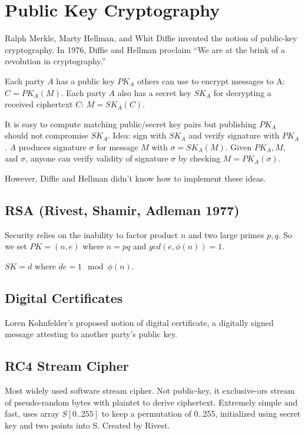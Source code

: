 \documentclass[psamsfonts]{amsart}
\begin{document}
\section{Public Key Cryptography}

Ralph Merkle, Marty Hellman, and Whit Diffie invented the notion of public-key cryptography. In 1976, Diffie and Hellman proclaim ``We are at the brink of a revolution in cryptography.''

Each party $A$ has a public key $PK_A$ others can use to encrypt messages to A: $C = PK_A(M)$. Each party $A$ also has a secret key $SK_A$ for decrypting a received ciphertext $C$: $M = SK_A(C)$. 

It is easy to compute matching public/secret key pairs but publishing $PK_A$ should not compromise $SK_A$. Idea: sign with $SK_A$ and verify signature with $PK_A$. $A$ produces signature $\sigma$ for message $M$ with $\sigma = SK_A(M)$. Given $PK_A, M,$ and $\sigma$, anyone can verify validity of signature $\sigma$ by checking $M = PK_A(\sigma)$. 

However, Diffie and Hellman didn't know how to implement these ideas.

\subsection{RSA (Rivest, Shamir, Adleman 1977)}

Security relies on the inability to factor product $n$ and two large primes $p, q$. So we set $PK = (n,e)$ where $n = pq$ and $gcd(e, \phi(n)) = 1$. 

$SK = d$ where $de = 1 \mod \phi(n)$. 

\subsection{Digital Certificates}

Loren Kohnfelder's proposed notion of digital certificate, a digitally signed message attesting to another party's public key.

\subsection{RC4 Stream Cipher}

Most widely used software stream cipher. Not public-key, it exclusive-ors stream of pseudo-random bytes with plaintet to derive ciphertext. Extremely simple and fast, uses array $S[0..255]$ to keep a permutation of 0..255, initialized using secret key and two points into S. Created by Rivest.
\end{document}
